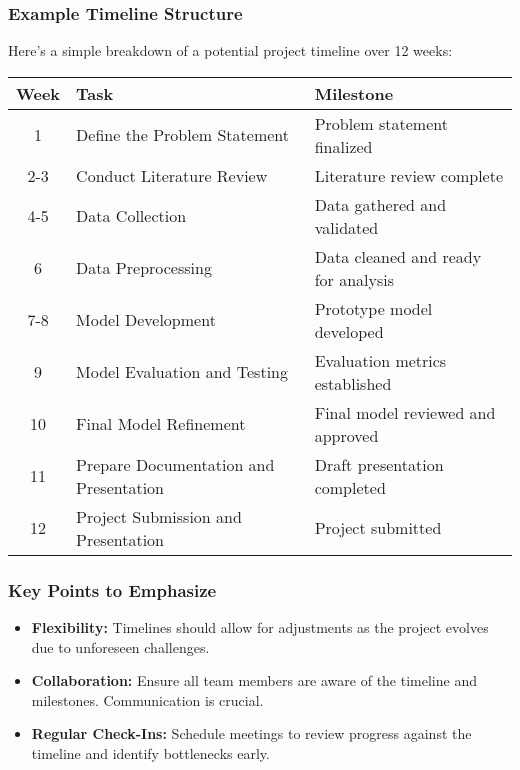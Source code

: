 \documentclass[aspectratio=169]{beamer}
\begin{document}
\begin{frame}[fragile]
    \frametitle{Example Timeline Structure}
    Here’s a simple breakdown of a potential project timeline over 12 weeks:

    \begin{table}[]
        \centering
        \begin{tabular}{|c|l|l|}
            \hline
            \textbf{Week} & \textbf{Task}                               & \textbf{Milestone}                         \\ \hline
            1              & Define the Problem Statement                 & Problem statement finalized                 \\ \hline
            2-3            & Conduct Literature Review                    & Literature review complete                   \\ \hline
            4-5            & Data Collection                              & Data gathered and validated                 \\ \hline
            6              & Data Preprocessing                           & Data cleaned and ready for analysis        \\ \hline
            7-8            & Model Development                            & Prototype model developed                    \\ \hline
            9              & Model Evaluation and Testing                 & Evaluation metrics established               \\ \hline
            10             & Final Model Refinement                       & Final model reviewed and approved           \\ \hline
            11             & Prepare Documentation and Presentation       & Draft presentation completed                \\ \hline
            12             & Project Submission and Presentation          & Project submitted                           \\ \hline
        \end{tabular}
    \end{table}
\end{frame}

\begin{frame}[fragile]
    \frametitle{Key Points to Emphasize}
    \begin{itemize}
        \item \textbf{Flexibility:} Timelines should allow for adjustments as the project evolves due to unforeseen challenges.
        \item \textbf{Collaboration:} Ensure all team members are aware of the timeline and milestones. Communication is crucial.
        \item \textbf{Regular Check-Ins:} Schedule meetings to review progress against the timeline and identify bottlenecks early.
    \end{itemize}
\end{frame}
\end{document}
